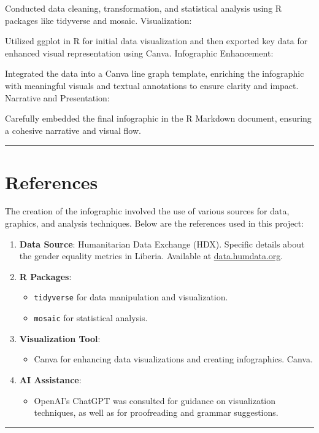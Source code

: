 \documentclass[
]{article}
\providecommand{\tightlist}{%
  \setlength{\itemsep}{0pt}\setlength{\parskip}{0pt}}
\begin{document}
Conducted data cleaning, transformation, and statistical analysis using
R packages like tidyverse and mosaic. Visualization:

Utilized ggplot in R for initial data visualization and then exported
key data for enhanced visual representation using Canva. Infographic
Enhancement:

Integrated the data into a Canva line graph template, enriching the
infographic with meaningful visuals and textual annotations to ensure
clarity and impact. Narrative and Presentation:

Carefully embedded the final infographic in the R Markdown document,
ensuring a cohesive narrative and visual flow.

\begin{center}\rule{0.5\linewidth}{0.5pt}\end{center}

\section{References}\label{references}

The creation of the infographic involved the use of various sources for
data, graphics, and analysis techniques. Below are the references used
in this project:

\begin{enumerate}
\def\labelenumi{\arabic{enumi}.}
\item
  \textbf{Data Source}: Humanitarian Data Exchange (HDX). Specific
  details about the gender equality metrics in Liberia. Available at
  \href{https://data.humdata.org/faq}{data.humdata.org}.
\item
  \textbf{R Packages}:

  \begin{itemize}
  \tightlist
  \item
    \texttt{tidyverse} for data manipulation and visualization.
  \item
    \texttt{mosaic} for statistical analysis.
  \end{itemize}
\item
  \textbf{Visualization Tool}:

  \begin{itemize}
  \tightlist
  \item
    Canva for enhancing data visualizations and creating infographics.
    Canva.
  \end{itemize}
\item
  \textbf{AI Assistance}:

  \begin{itemize}
  \tightlist
  \item
    OpenAI's ChatGPT was consulted for guidance on visualization
    techniques, as well as for proofreading and grammar suggestions.
  \end{itemize}
\end{enumerate}

\begin{center}\rule{0.5\linewidth}{0.5pt}\end{center}
\end{document}
